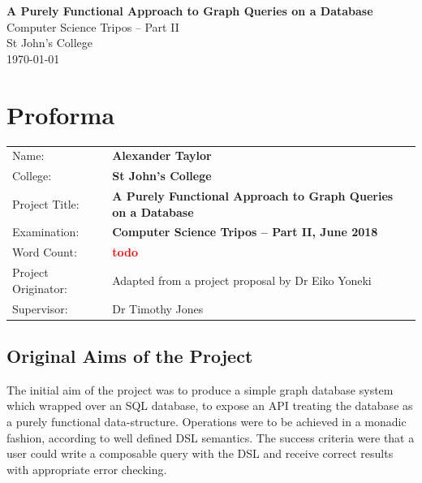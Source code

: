 \documentclass[12pt,a4paper,twoside,openright]{report}
\newcommand\todo[1]{\textcolor{red}{#1}}
\newcommand{\projectTitle}[0]{A Purely Functional Approach to Graph Queries on a Database}
\begin{document}


\pagestyle{empty}


\vspace*{60mm}
\begin{center}
\Huge
\textbf{\projectTitle} \\[5mm]
Computer Science Tripos -- Part II \\[5mm]
St John's College \\[5mm]
\today  %
\end{center}


\pagestyle{plain}

\chapter*{Proforma}

{\large
\begin{tabular}{p{5cm}p{10cm}}
Name:               & \bf Alexander Taylor                       \\
College:            & \bf St John's College                     \\
Project Title:      & \bf \projectTitle  \\
Examination:        & \bf Computer Science Tripos -- Part II, June 2018  \\
Word Count:         & \bf \todo{todo}   \\
Project Originator: & Adapted from a project proposal by Dr Eiko Yoneki                    \\
Supervisor:         & Dr Timothy Jones                    \\ 
\end{tabular}
}

\section*{Original Aims of the Project}

The initial aim of the project was to produce a simple graph database system which wrapped over an SQL database, to expose an API treating the database as a purely functional data-structure. Operations were to be achieved in a monadic fashion, according to well defined DSL semantics. The success criteria were that a user could write a composable query with the DSL and receive correct results with appropriate error checking.
\end{document}
